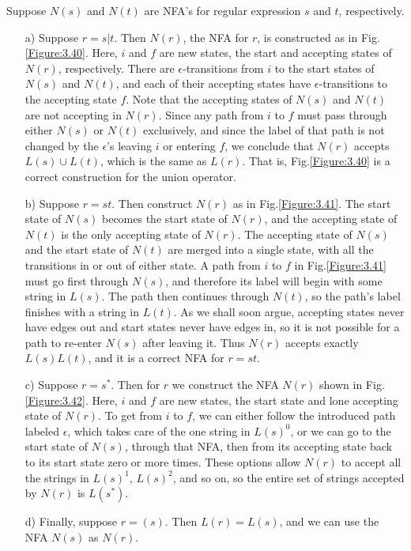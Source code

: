 \documentclass[a4paper,twoside]{book}
\begin{document}
{     Suppose $N(s)$ and $N(t)$ are NFA's for regular expression $s$ and $t$, respectively.
    \begin{itemize}
        \item[a)] Suppose $r=s|t$. Then $N(r)$, the NFA for $r$, is constructed as in Fig.\;\ref{Figure:3.40}. Here, $i$ and $f$ are new states, the start and accepting states of $N(r)$, respectively. There are $\epsilon$-transitions from $i$ to the start states of $N(s)$ and $N(t)$, and each of their accepting states have $\epsilon$-transitions to the accepting state $f$. Note that the accepting states of $N(s)$ and $N(t)$ are not accepting in $N(r)$. Since any path from $i$ to $f$ must pass through either $N(s)$ or $N(t)$ exclusively, and since the label of that path is not changed by the $\epsilon$'s leaving $i$ or entering $f$, we conclude that $N(r)$ accepts $L(s)\cup L(t)$, which is the same as $L(r)$. That is, Fig.\;\ref{Figure:3.40} is a correct construction for the union operator.
        \item[b)] Suppose $r=st$. Then construct $N(r)$ as in Fig.\;\ref{Figure:3.41}. The start state of $N(s)$ becomes the start state of $N(r)$, and the accepting state of $N(t)$ is the only accepting state of $N(r)$. The accepting state of $N(s)$ and the start state of $N(t)$ are merged into a single state, with all the transitions in or out of either state. A path from $i$ to $f$ in Fig.\;\ref{Figure:3.41} must go first through $N(s)$, and therefore its label will begin with some string in $L(s)$. The path then continues through $N(t)$, so the path's label finishes with a string in $L(t)$. As we shall soon argue, accepting states never have edges out and start states never have edges in, so it is not possible for a path to re-enter $N(s)$ after leaving it. Thus $N(r)$ accepts exactly $L(s)L(t)$, and it is a correct NFA for $r=st$.
        \item[c)] Suppose $r=s^*$. Then for $r$ we construct the NFA $N(r)$ shown in Fig.\;\ref{Figure:3.42}. Here, $i$ and $f$ are new states, the start state and lone accepting state of $N(r)$. To get from $i$ to $f$, we can either follow the introduced path labeled $\epsilon$, which takes care of the one string in $L(s)^0$, or we can go to the start state of $N(s)$, through that NFA, then from its accepting state back to its start state zero or more times. These options allow $N(r)$ to accept all the strings in $L(s)^1$, $L(s)^2$, and so on, so the entire set of strings accepted by $N(r)$ is $L(s^*)$.
        \item[d)] Finally, suppose $r=(s)$. Then $L(r)=L(s)$, and we can use the NFA $N(s)$ as $N(r)$.
    \end{itemize}
}
\end{document}
